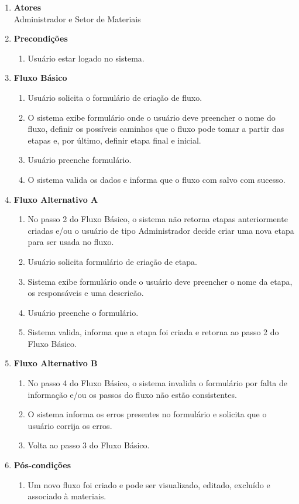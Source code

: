 \begin{enumerate}[label=\textbf{UC\protect\twodigits{\theenumi}}, leftmargin=2cm]
	\begin{enumerate}[label=, leftmargin=0cm]
		\item \textbf{Atores} \\
		Administrador e Setor de Materiais
		\item \textbf{Precondições}
			\begin{enumerate}[label=\arabic*.]
				\item Usuário estar logado no sistema.
			\end{enumerate}
		\item \textbf{Fluxo Básico}
			\begin{enumerate}[label=\arabic*.]
				\item Usuário solicita o formulário de criação de fluxo.
				\item O sistema exibe formulário onde o usuário deve preencher o nome do fluxo, definir os possíveis caminhos que o fluxo pode tomar a partir das etapas e, por último, definir etapa final e inicial.
				\item Usuário preenche formulário.
				\item O sistema valida os dados e informa que o fluxo com salvo com sucesso.
			\end{enumerate}
		\item \textbf{Fluxo Alternativo A}
			\begin{enumerate}[label=\arabic*.]
				\item No passo 2 do Fluxo Básico, o sistema não retorna etapas anteriormente criadas e/ou o usuário de tipo Administrador decide criar uma nova etapa para ser usada no fluxo. 
				\item Usuário solicita formulário de criação de etapa.
				\item Sistema exibe formulário onde o usuário deve preencher o nome da etapa, os responsáveis e uma descricão.
				\item Usuário preenche o formulário.
				\item Sistema valida, informa que a etapa foi criada e retorna ao passo 2 do Fluxo Básico.
			\end{enumerate}
		\item \textbf{Fluxo Alternativo B}
			\begin{enumerate}[label=\arabic*.]
				\item No passo 4 do Fluxo Básico, o sistema invalida o formulário por falta de informação e/ou os passos do fluxo não estão consistentes.
				\item O sistema informa os erros presentes no formulário e solicita que o usuário corrija os erros.
				\item Volta ao passo 3 do Fluxo Básico.
			\end{enumerate}
		\item \textbf{Pós-condições}
			\begin{enumerate}[label=\arabic*.]
				\item Um novo fluxo foi criado e pode ser visualizado, editado, excluído e associado à materiais.
			\end{enumerate}
	\end{enumerate}
	 

\end{enumerate}
